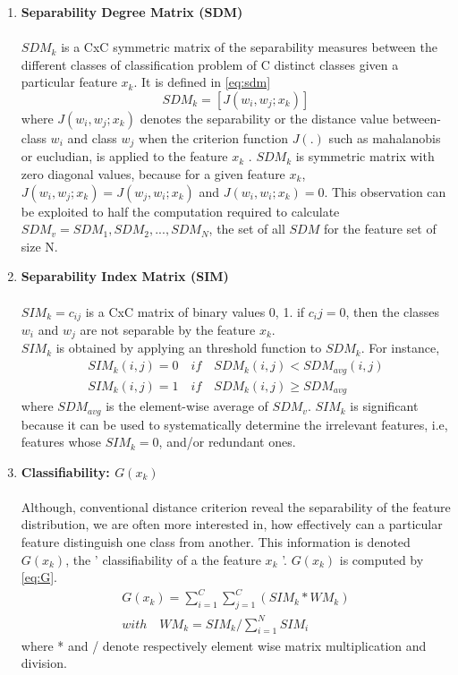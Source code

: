 \begin{enumerate}
	\item \textbf{Separability Degree Matrix (SDM)}\\\\
	\(SDM_k\) is a CxC symmetric matrix of the separability measures between the different classes of classification problem of C distinct classes given a particular feature \(x_k\).
	It is defined in \ref{eq:sdm}
\subitem \[SDM_k = [J(w_i, w_j; {x_k})] \label{eq:sdm}\]	
\subitem where \(J(w_i, w_j; {x_k})\) denotes the separability or the distance value between-class \(w_i\)  and class \(w_j\) when the criterion function \(J(\textbf{.})\) such as mahalanobis \cite{maha2013} or eucludian, is applied to the feature \(x_k\) \cite{sima2013}. 
	\(SDM_k\) is symmetric matrix with zero diagonal values, because for a given feature \(x_k\), \(J(w_i, w_j; {x_k}) = J(w_j, w_i; {x_k})\) and \(J(w_i, w_i; {x_k}) = 0\).
	This observation can be exploited  to half the computation required to calculate \(SDM_v = {SDM_1, SDM_2, ..., SDM_N}\), the set of  all \(SDM\) for the feature set of size N.
	 
	\item \textbf{Separability Index Matrix (SIM)}\\\\
	\(SIM_k = {c_{ij}}\) is a CxC matrix of binary values {0, 1}. if \(c_ij=0\), then the classes \(w_i\) and \(w_j\) are not separable by the feature \(x_k\).\\
	\(SIM_k\) is obtained by applying an threshold function to \(SDM_k\).
	For instance, 
	\begin{align*}
		SIM_k(i, j) = 0 \quad if  \quad SDM_k(i, j) < SDM_{avg}(i, j)\\
		SIM_k(i,j) = 1 \quad if  \quad SDM_k(i,j) \geq SDM_{avg}
	\end{align*}
	where \(SDM_{avg}\) is the element-wise average of \(SDM_v\).
	\(SIM_k\) is significant because it can be used to systematically determine the irrelevant features, i.e, features whose \(SIM_k = 0\), and/or redundant ones. \cite{sima2013}
	
	
	\item \textbf{Classifiability: \(G(x_k)\)} \label{con:class}\\\\
	Although, conventional distance criterion reveal the separability of the feature distribution, \cite{sima2013}
	 we are often more interested in, how effectively can a particular feature distinguish one class from another. This information is denoted \(G(x_k)\), the ' classifiability of a the feature \(x_k\) '.
	 \(G(x_k)\) is computed by \ref{eq:G}.
	 \begin{align}
	 	G(x_k) = \sum_{i = 1}^{C}\sum_{j = 1}^{C}(SIM_k*WM_k) \label{eq:G}
	 	\\ with \quad WM_k = SIM_k / \sum_{i=1}^{N}SIM_i
	 \end{align}
	 where * and / denote respectively element wise matrix multiplication and division.
\end{enumerate}

